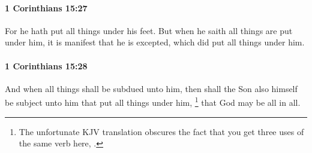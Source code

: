 		\paragraph{1 Corinthians 15:27} %
			\label{1CORINTHIANS-15-27}

			For he hath put all things under his feet.  But when he saith all things are put under him, it is manifest that he is excepted, which did put all things under him.

			\begin{framed}
			\scriptsize
				\begin{compactdesc}
					\item[SBLG]  \hyperref[HUPOTASSO]{}  \hyperref[HUPOTASSO]{} \hyperref[HUPOTASSO]{} 
				\end{compactdesc}
			\end{framed}

		\paragraph{1 Corinthians 15:28} %
			\label{1CORINTHIANS-15-28}

			And when all things shall be subdued unto him, then shall the Son also himself be subject unto him that put all things under him,%
				\footnote{%
					The unfortunate KJV translation obscures the fact that you get three uses of the same verb here, .
					}
			that God may be all in all.


